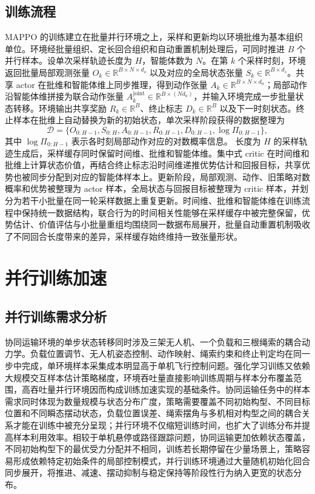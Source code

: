 \subsection{训练流程}

MAPPO 的训练建立在批量并行环境之上，采样和更新均以环境批维为基本组织单位。环境经批量组织、定长回合组织和自动重置机制处理后，可同时推进 $B$ 个并行样本。设单次采样轨迹长度为 $H$，智能体数为 $N$。在第 $k$ 个采样时刻，环境返回批量局部观测张量 $O_k \in \mathbb R^{B\times N\times d_o}$ 以及对应的全局状态张量 $S_k \in \mathbb R^{B\times d_s}$。共享 actor 在批维和智能体维上同步推理，得到动作张量 $A_k \in \mathbb R^{B\times N\times d_a}$；局部动作沿智能体维拼接为联合动作张量 $A_k^{\mathrm{joint}} \in \mathbb R^{B\times (N d_a)}$，并输入环境完成一步批量状态转移。环境输出共享奖励 $R_k \in \mathbb R^{B}$、终止标志 $D_k \in \mathbb R^{B}$ 以及下一时刻状态。终止样本在批维上自动替换为新的初始状态，单次采样阶段获得的数据整理为
\begin{equation}
    \mathcal D=
    \{O_{0:H-1},S_{0:H},A_{0:H-1},R_{0:H-1},D_{0:H-1},\log \Pi_{0:H-1}\},
\end{equation}
其中 $\log \Pi_{0:H-1}$ 表示各时刻局部动作对应的对数概率信息。
长度为 $H$ 的采样轨迹生成后，采样缓存同时保留时间维、批维和智能体维。集中式 critic 在时间维和批维上计算状态价值，再结合终止标志沿时间维递推优势估计和回报目标，共享优势也被同步分配到对应的智能体样本上。更新阶段，局部观测、动作、旧策略对数概率和优势被整理为 actor 样本，全局状态与回报目标被整理为 critic 样本，并划分为若干小批量在同一轮采样数据上重复更新。时间维、批维和智能体维在训练流程中保持统一数据结构，联合行为的时间相关性能够在采样缓存中被完整保留，优势估计、价值评估与小批量重组均围绕同一数据布局展开，批量自动重置机制吸收了不同回合长度带来的差异，采样缓存始终维持一致张量形状。

\section{并行训练加速}

\subsection{并行训练需求分析}

协同运输环境的单步状态转移同时涉及三架无人机、一个负载和三根绳索的耦合动力学。负载位置调节、无人机姿态控制、动作映射、绳索约束和终止判定均在同一步中完成，单环境样本采集成本明显高于单机飞行控制问题。强化学习训练又依赖大规模交互样本估计策略梯度，环境吞吐量直接影响训练周期与样本分布覆盖范围，高吞吐量并行环境因而构成训练加速实现的基础条件。协同运输任务中的样本需求同时体现为数量规模与状态分布广度，策略需要覆盖不同初始构型、不同目标位置和不同瞬态摆动状态，负载位置误差、绳索摆角与多机相对构型之间的耦合关系才能在训练中被充分呈现；并行环境不仅缩短训练时间，也扩大了训练分布并提高样本利用效率。相较于单机悬停或路径跟踪问题，协同运输更加依赖状态覆盖，不同初始构型下的最优受力分配并不相同，训练若长期停留在少量场景上，策略容易形成依赖特定初始条件的局部控制模式，并行训练环境通过大量随机初始化回合同步展开，将推进、减速、摆动抑制与稳定保持等阶段性行为纳入更宽的状态分布。

